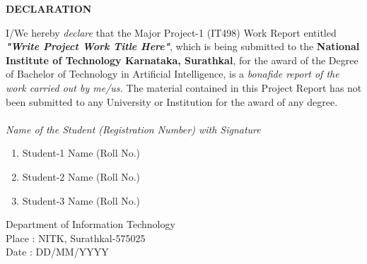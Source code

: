 
\begin{framed}
	\begin{center}
		\textbf{{\Large DECLARATION}}\\
	\end{center}
	\null
	I/We hereby \textit{declare} that the Major Project-1 (IT498) Work Report entitled \textit{\textbf{"Write Project Work Title Here"}},  which is being submitted to the \textbf{National Institute of Technology Karnataka, Surathkal}, for the award of the Degree of Bachelor of Technology in Artificial Intelligence, is a \textit{bonafide report of the work carried out by me/us.} The material contained in this Project Report has not been submitted to any University or Institution for the award of any degree.
	\\
	\\
	\textit{Name of the Student (Registration Number) with Signature }
	\begin{enumerate}[label={(\arabic*)}]
		\item  Student-1 Name  (Roll No.)
		\item  Student-2 Name  (Roll No.)
		\item  Student-3 Name  (Roll No.)
	\end{enumerate}
	\null
	Department of Information Technology \\
	Place     : NITK, Surathkal-575025 \\
	Date      : DD/MM/YYYY 
	\\
	\\
	\\
	\\
	\\
	\\
	\\
	\\
	\\
	\\
\end{framed}